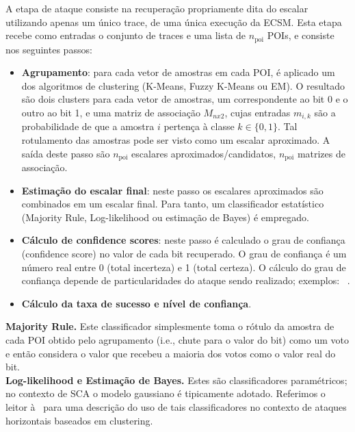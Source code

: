 A etapa de ataque consiste na recuperação propriamente dita do escalar utilizando apenas um único trace, 
de uma única execução da ECSM. Esta etapa recebe como entradas o conjunto de traces e uma lista de $n_{\mathrm{poi}}$ POIs, e consiste nos seguintes passos:
\begin{itemize}
	\item \textbf{Agrupamento}: para cada vetor de amostras em cada POI, é aplicado um dos algoritmos de clustering (K-Means, Fuzzy K-Means ou EM). O resultado são dois clusters para cada vetor de amostras, um correspondente ao bit 0 e o outro ao bit 1, e uma matriz de associação $M_{nx2}$, cujas entradas $m_{i,k}$ são a probabilidade de que a amostra $i$ pertença à classe $k\in \{0,1\}$. Tal rotulamento das amostras pode ser visto como um escalar aproximado. A saída deste passo são $n_{\mathrm{poi}}$ escalares aproximados/candidatos, $n_{\mathrm{poi}}$ matrizes de associação.
	
	\item \textbf{Estimação do escalar final}: neste passo os escalares aproximados são combinados em um escalar final. Para tanto, um classificador estatístico (Majority Rule, Log-likelihood ou estimação de Bayes) é empregado.
	
	\item \textbf{Cálculo de confidence scores}: neste passo é calculado o grau de confiança (confidence score) no valor de cada bit recuperado. O grau de confiança é um número real entre 0 (total incerteza) e 1 (total certeza). O cálculo do grau de confiança depende de particularidades do ataque sendo realizado; exemplos: ~\cite{Nascimento2016_SAC,PerinChmielewski2015}.
	
	\item \textbf{Cálculo da taxa de sucesso e nível de confiança}.
\end{itemize}

\noindent \textbf{Majority Rule.} Este classificador simplesmente toma o rótulo da amostra de cada POI obtido pelo agrupamento (i.e., chute para o valor do bit) como um voto e então considera o valor que recebeu a maioria dos votos como o valor real do bit. \\

\noindent \textbf{Log-likelihood e Estimação de Bayes.} Estes são classificadores paramétricos; no contexto de SCA o modelo gaussiano é tipicamente adotado. Referimos o leitor à~\cite{Perin2014,PerinChmielewski2015} para uma descrição do uso de tais classificadores no contexto de ataques horizontais baseados em clustering.

